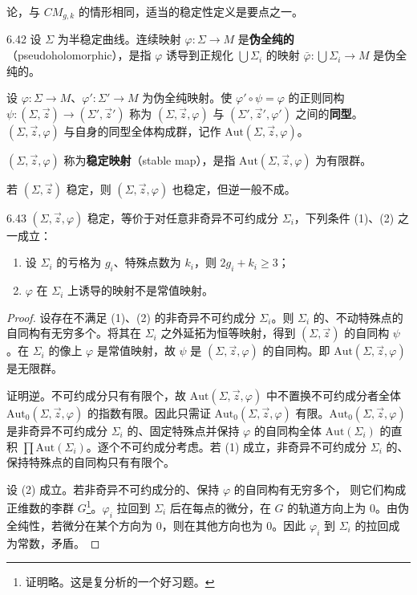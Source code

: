 
论，与 $CM_{g,k}$ 的情形相同，适当的稳定性定义是要点之一。

\begin{definition}{6.42}
  设 $\Sigma$ 为半稳定曲线。连续映射 $\varphi:\Sigma\to M$ 是\textbf{伪全纯的}（pseudoholomorphic），是指 $\varphi$ 诱导到正规化 $\bigcup\Sigma_i$ 的映射 $\bar\varphi:\bigcup\Sigma_i\to M$ 是伪全纯的。

  设 $\varphi:\Sigma\to M$、$\varphi':\Sigma'\to M$ 为伪全纯映射。使 $\varphi'\circ\psi=\varphi$ 的正则同构 $\psi:(\Sigma,\vec z)\to(\Sigma',\vec z')$ 称为 $(\Sigma,\vec z,\varphi)$ 与 $(\Sigma',\vec z',\varphi')$ 之间的\textbf{同型}。$(\Sigma,\vec z,\varphi)$ 与自身的同型全体构成群，记作 $\mathrm{Aut}(\Sigma,\vec z,\varphi)$。

  $(\Sigma,\vec z,\varphi)$ 称为\textbf{稳定映射}（stable map），是指 $\mathrm{Aut}(\Sigma,\vec z,\varphi)$ 为有限群。
\end{definition}

若 $(\Sigma,\vec z)$ 稳定，则 $(\Sigma,\vec z,\varphi)$ 也稳定，但逆一般不成。

\begin{lemma*}{6.43}
  $(\Sigma,\vec z,\varphi)$ 稳定，等价于对任意非奇异不可约成分 $\Sigma_i$，下列条件 (1)、(2) 之一成立：
  \begin{enumerate}[label=（\arabic*）]
    \item 设 $\Sigma_i$ 的亏格为 $g_i$、特殊点数为 $k_i$，则 $2g_i+k_i\ge3$；
    \item $\varphi$ 在 $\Sigma_i$ 上诱导的映射不是常值映射。
  \end{enumerate}
\end{lemma*}
\begin{proof}
  设存在不满足 (1)、(2) 的非奇异不可约成分 $\Sigma_i$。则 $\Sigma_i$ 的、不动特殊点的自同构有无穷多个。将其在 $\Sigma_i$ 之外延拓为恒等映射，得到 $(\Sigma,\vec z)$ 的自同构 $\psi$。在 $\Sigma_i$ 的像上 $\varphi$ 是常值映射，故 $\psi$ 是 $(\Sigma,\vec z,\varphi)$ 的自同构。即 $\mathrm{Aut}(\Sigma,\vec z,\varphi)$ 是无限群。

  证明逆。不可约成分只有有限个，故 $\mathrm{Aut}(\Sigma,\vec z,\varphi)$ 中不置换不可约成分者全体 $\mathrm{Aut}_0(\Sigma,\vec z,\varphi)$ 的指数有限。因此只需证 $\mathrm{Aut}_0(\Sigma,\vec z,\varphi)$ 有限。$\mathrm{Aut}_0(\Sigma,\vec z,\varphi)$ 是非奇异不可约成分 $\Sigma_i$ 的、固定特殊点并保持 $\varphi$ 的自同构全体 $\mathrm{Aut}(\Sigma_i)$ 的直积 $\prod\mathrm{Aut}(\Sigma_i)$。逐个不可约成分考虑。若 (1) 成立，非奇异不可约成分 $\Sigma_i$ 的、保持特殊点的自同构只有有限个。

  设 (2) 成立。若非奇异不可约成分的、保持 $\varphi$ 的自同构有无穷多个，
  则它们构成正维数的李群 $G$\footnote{证明略。这是复分析的一个好习题。}。$\varphi_i$ 拉回到 $\Sigma_i$ 后在每点的微分，在 $G$ 的轨道方向上为 $0$。由伪全纯性，若微分在某个方向为 $0$，则在其他方向也为 $0$。因此 $\varphi_i$ 到 $\Sigma_i$ 的拉回成为常数，矛盾。
\end{proof}

